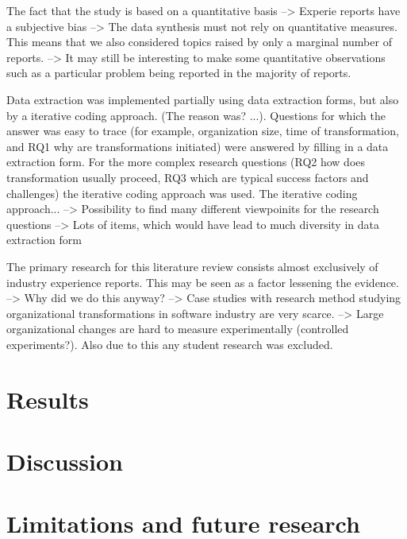 \documentclass[preprint,authoryear,12pt]{elsarticle}
\begin{document}
The fact that the study is based on a quantitative basis
--> Experie reports have a subjective bias
--> The data synthesis must not rely on quantitative measures. This means that
    we also considered topics raised by only a marginal number of reports.
--> It may still be interesting to make some quantitative observations such as
    a particular problem being reported in the majority of reports.


Data extraction was implemented partially using data extraction forms, but also
by a iterative coding approach. (The reason was? ...). Questions for which the
answer was easy to trace (for example, organization size, time of
transformation, and RQ1 why are transformations initiated) were answered by
filling in a data extraction form. For the more complex research questions (RQ2
how does transformation usually proceed, RQ3 which are typical success factors
and challenges) the iterative coding approach was used. The iterative coding
approach...
--> Possibility to find many different viewpoinits for the research questions
--> Lots of items, which would have lead to much diversity in data extraction form 


The primary research for this literature review consists almost exclusively of
industry experience reports. This may be seen as a factor lessening the
evidence.
--> Why did we do this anyway?
--> Case studies with research method studying organizational transformations in
    software industry are very scarce.
--> Large organizational changes are hard to measure experimentally (controlled
    experiments?). Also due to this any student research was excluded.

\section{Results}
\label{sec:results}


\section{Discussion}
\label{sec:discussion}


\section{Limitations and future research}
\label{sec:conclusion}






\end{document}

